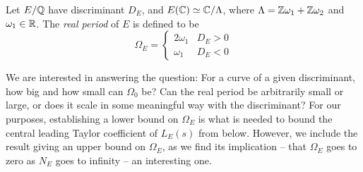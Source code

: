 \documentclass[10pt]{article}
\newcommand{\Les}{L_E(s)}
\begin{document}
\begin{definition}\label{defn:real_period}
Let $E/\mathbb{Q}$ have discriminant $D_E$, and $E(\mathbb{C}) \simeq \mathbb{C}/\Lambda$, where $\Lambda = \mathbb{Z}\omega_1 + \mathbb{Z}\omega_2$ and $\omega_1 \in \mathbb{R}$. The {\it real period} of $E$ is defined to be
\begin{equation}
\Omega_E = \begin{cases} 2\omega_1 & D_E > 0 \\ \omega_1 & D_E < 0 \end{cases}
\end{equation}
\end{definition}

We are interested in answering the question: For a curve of a given discriminant, how big and how small can $\Omega_0$ be? Can the real period be arbitrarily small or large, or does it scale in some meaningful way with the discriminant? For our purposes, establishing a lower bound on $\Omega_E$ is what is needed to bound the central leading Taylor coefficient of $\Les$ from below. However, we include the result giving an upper bound on $\Omega_E$, as we find its implication -- that $\Omega_E$ goes to zero as $N_E$ goes to infinity -- an interesting one. \\
\end{document}
